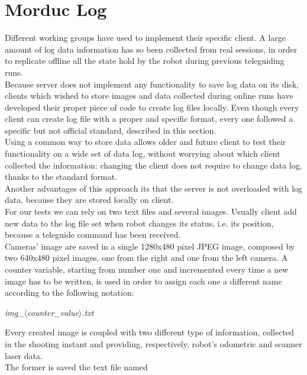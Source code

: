 \section{Morduc Log}
\label{log:morduc}

Different working groups have used \morduc{} to implement their
specific client. A large amount of log data
information has so been collected from real sessions, in
order to replicate offline all the state hold by the robot
during previous teleguiding runs.
\\
Because \morduc{} server does not implement any functionality
to save log data on its disk, clients which wished to store
images and data collected during online runs have developed their
proper piece of code to create log files locally.
Even though every client can create log file with a proper and
specific format, every one followed a specific but not official
standard, described in this section.
\\
Using a common way to store data allows older and future client to
test their functionality on a wide set of data log, without
worrying about which client collected the information:
changing the client does not require to change data log,
thanks to the standard format.
\\
Another advantages of this approach 
its that the server is not overloaded
with log data, because they are stored locally on client.
\\
For our tests we can rely on two text files and several images.
Usually client add new data to the log file set 
when robot changes its status,
i.e. its position, because a teleguide command has
been received.
\\
Cameras' image are saved in 
a single 1280x480 pixel JPEG image, composed by two
640x480 pixel images, one from the right and one from the left camera.
A counter variable,
starting from number one and incremented every time a new image
has to be written, is used in order to assign each one a different
name according to the following notation:

\begin{center}
  \textit{img\_$\langle$counter\_value$\rangle$.txt}
\end{center}

Every created image is coupled with two different type of
information, collected in the shooting instant and providing,
respectively, robot's odometric and scanner laser data.
\\
The former is saved the text file named

